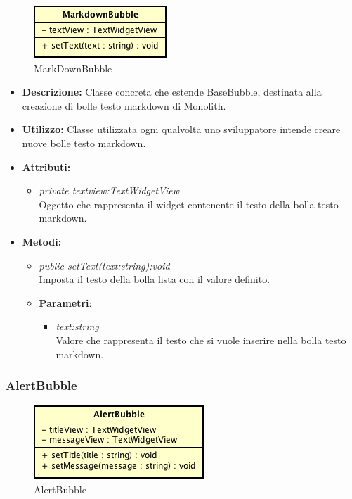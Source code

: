 \label{MarkdownBubble}
\begin{figure}[ht]
	\centering
	\includegraphics[scale=0.5]{Sezioni/SottosezioniST/img/MarkdownBubble.png}
	\caption{MarkDownBubble}
\end{figure}

\begin{itemize}
\item \textbf{Descrizione:} Classe concreta che estende BaseBubble, destinata alla creazione di bolle testo markdown di Monolith.
\item \textbf{Utilizzo:} Classe utilizzata ogni qualvolta uno sviluppatore intende creare nuove bolle testo markdown.
\item \textbf{Attributi:}
\begin{itemize}
\item \textit{private textview:TextWidgetView}\\
Oggetto che rappresenta il widget contenente il testo della bolla testo markdown.
\end{itemize}
\item \textbf{Metodi:}
\begin{itemize}
\item \textit{public setText(text:string):void}\\
Imposta il testo della bolla lista con il valore definito.
\item{\textbf{Parametri}: \begin{itemize}
\item \textit{text:string}\\
Valore che rappresenta il testo che si vuole inserire nella bolla testo markdown.
\end{itemize}}
\end{itemize}
\end{itemize}

\subsubsection{AlertBubble}

\label{AlertBubble}
\begin{figure}[ht]
	\centering
	\includegraphics[scale=0.5]{Sezioni/SottosezioniST/img/AlertBubble.png}
	\caption{AlertBubble}
\end{figure}

